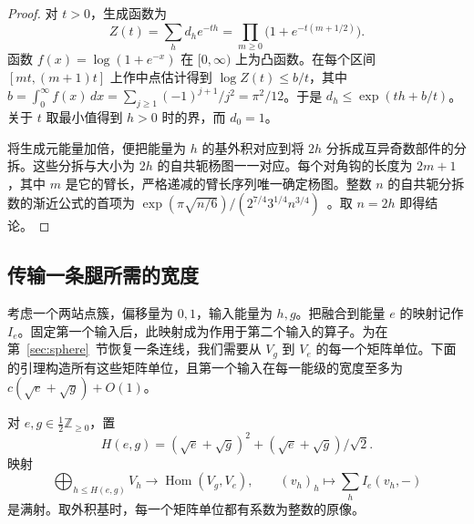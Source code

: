 \begin{proof}
对 $t>0$，生成函数为
\[
 Z(t)=\sum_h d_h e^{-th}
     =\prod_{m\ge0}\bigl(1+e^{-t(m+1/2)}\bigr).
\]
函数 $f(x)=\log(1+e^{-x})$ 在 $[0,\infty)$ 上为凸函数。在每个区间 $[mt,(m+1)t]$ 上作中点估计得到 $\log Z(t)\le b/t$，其中 $b=\int_0^\infty f(x)\,dx=\sum_{j\ge1}(-1)^{j+1}/j^2=\pi^2/12$。于是 $d_h\le \exp(th+b/t)$。关于 $t$ 取最小值得到 $h>0$ 时的界，而 $d_0=1$。

将生成元能量加倍，便把能量为 $h$ 的基外积对应到将 $2h$ 分拆成互异奇数部件的分拆。这些分拆与大小为 $2h$ 的自共轭杨图一一对应。每个对角钩的长度为 $2m+1$，其中 $m$ 是它的臂长，严格递减的臂长序列唯一确定杨图。整数 $n$ 的自共轭分拆数的渐近公式的首项为 $\exp(\pi\sqrt{n/6})/(2^{7/4}3^{1/4}n^{3/4})$~\cite[第~5.1~节]{Wildon}。取 $n=2h$ 即得结论。
\end{proof}

\subsection{传输一条腿所需的宽度}
考虑一个两站点簇，偏移量为 $0,1$，输入能量为 $h,g$。把融合到能量 $e$ 的映射记作 $I_e$。固定第一个输入后，此映射成为作用于第二个输入的算子。为在第~\ref{sec:sphere}~节恢复一条连线，我们需要从 $V_g$ 到 $V_e$ 的每一个矩阵单位。下面的引理构造所有这些矩阵单位，且第一个输入在每一能级的宽度至多为 $c(\sqrt e+\sqrt g)+O(1)$。

\begin{lemma}[融合宽度]\label{lem:width}
对 $e,g\in\frac12\mathbb Z_{\ge0}$，置
\[
 H(e,g)=(\sqrt e+\sqrt g)^2+(\sqrt e+\sqrt g)/\sqrt2.
\]
映射
\[
 \bigoplus_{h\le H(e,g)} V_h \longrightarrow
       \operatorname{Hom}(V_g,V_e),\qquad
 (v_h)_h\longmapsto\sum_h I_e(v_h,-)
\]
是满射。取外积基时，每一个矩阵单位都有系数为整数的原像。
\end{lemma}

